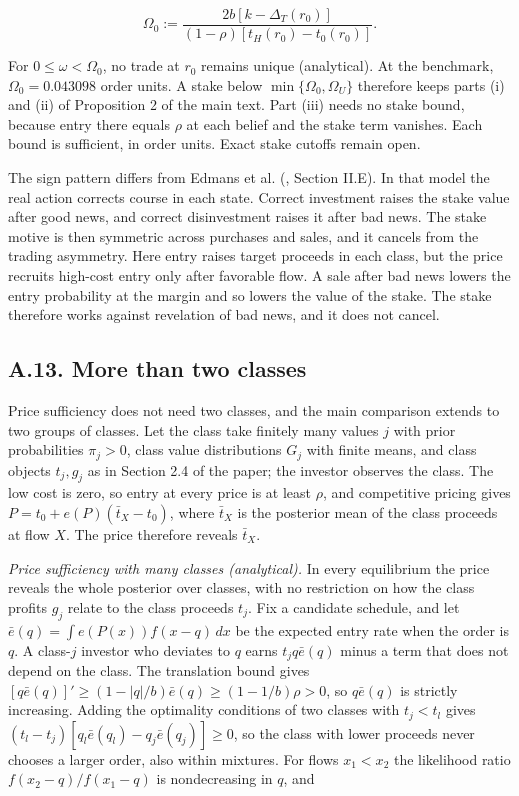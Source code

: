 \documentclass[
  11pt,
]{article}
\begin{document}
\[
\Omega_0:=
\frac{2b[k-\Delta_T(r_0)]}
{(1-\rho)[t_H(r_0)-t_0(r_0)]}.
\tag{OA.64}\label{eq:oa-oa-64}
\]

For \(0\le\omega<\Omega_0\), no trade at \(r_0\) remains unique
(analytical). At the benchmark, \(\Omega_0=0.043098\) order
units. A stake below \(\min\{\Omega_0,\Omega_U\}\) therefore keeps
parts (i) and (ii) of Proposition 2 of the main text. Part (iii)
needs no stake bound, because entry there equals \(\rho\) at each
belief and the stake term vanishes. Each bound is sufficient, in
order units. Exact stake cutoffs remain open.

The sign pattern differs from Edmans et al.
(, Section II.E). In
that model the real action corrects course in each state. Correct
investment raises the stake value after good news, and correct
disinvestment raises it after bad news. The stake motive is then
symmetric across purchases and sales, and it cancels from the
trading asymmetry. Here entry raises target proceeds in each class,
but the price recruits high-cost entry only after favorable flow. A
sale after bad news lowers the entry probability at the margin and
so lowers the value of the stake. The stake therefore works against
revelation of bad news, and it does not cancel.

\subsection{A.13. More than two classes}\label{oa-a-classes}

Price sufficiency does not need two classes, and the main comparison
extends to two groups of classes. Let the class take finitely many
values \(j\) with prior probabilities \(\pi_j>0\), class value
distributions \(G_j\) with finite means, and class objects \(t_j,g_j\)
as in Section 2.4 of the paper; the investor observes
the class. The low cost is zero, so entry at every price is at least
\(\rho\), and competitive pricing gives \(P=t_0+e(P)(\bar t_X-t_0)\), where
\(\bar t_X\) is the posterior mean of the class proceeds at flow \(X\). The
price therefore reveals \(\bar t_X\).

\emph{Price sufficiency with many classes (analytical).} In every
equilibrium the price reveals the whole posterior over classes, with no
restriction on how the class profits \(g_j\) relate to the class
proceeds \(t_j\). Fix a candidate schedule, and let
\(\bar e(q)=\int e(P(x))f(x-q)\,dx\) be the expected entry rate when the
order is \(q\). A class-\(j\) investor who deviates to \(q\) earns
\(t_jq\bar e(q)\) minus a term that does not depend on the class. The
translation bound gives
\([q\bar e(q)]'\ge(1-|q|/b)\bar e(q)\ge(1-1/b)\rho>0\), so
\(q\bar e(q)\) is strictly increasing. Adding the optimality conditions
of two classes with \(t_j<t_l\) gives
\((t_l-t_j)[q_l\bar e(q_l)-q_j\bar e(q_j)]\ge0\), so the class with
lower proceeds never chooses a larger order, also within mixtures. For
flows \(x_1<x_2\) the likelihood ratio \(f(x_2-q)/f(x_1-q)\) is
nondecreasing in \(q\), and
\end{document}
